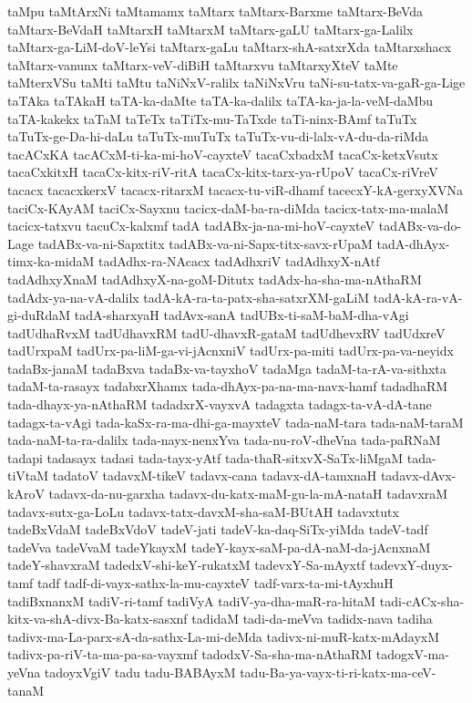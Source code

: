 {taMpu
taMtArxNi
taMtamamx
taMtarx
taMtarx-Barxme
taMtarx-BeVda
taMtarx-BeVdaH
taMtarxH
taMtarxM
taMtarx-gaLU
taMtarx-ga-Lalilx
taMtarx-ga-LiM-doV-leYsi
taMtarx-gaLu
taMtarx-shA-satxrXda
taMtarxshacx
taMtarx-vanunx
taMtarx-veV-diBiH
taMtarxvu
taMtarxyXteV
taMte
taMterxVSu
taMti
taMtu
taNiNxV-ralilx
taNiNxVru
taNi-su-tatx-va-gaR-ga-Lige
taTAka
taTAkaH
taTA-ka-daMte
taTA-ka-dalilx
taTA-ka-ja-la-veM-daMbu
taTA-kakekx
taTaM
taTeTx
taTiTx-mu-TaTxde
taTi-ninx-BAmf
taTuTx
taTuTx-ge-Da-hi-daLu
taTuTx-muTuTx
taTuTx-vu-di-lalx-vA-du-da-riMda
tacACxKA
tacACxM-ti-ka-mi-hoV-cayxteV
tacaCxbadxM
tacaCx-ketxVsutx
tacaCxkitxH
tacaCx-kitx-riV-ritA
tacaCx-kitx-tarx-ya-rUpoV
tacaCx-riVreV
tacacx
tacacxkerxV
tacacx-ritarxM
tacacx-tu-viR-dhamf
tacecxY-kA-gerxyXVNa
taciCx-KAyAM
taciCx-Sayxnu
tacicx-daM-ba-ra-diMda
tacicx-tatx-ma-malaM
tacicx-tatxvu
tacuCx-kalxmf
tadA
tadABx-ja-na-mi-hoV-cayxteV
tadABx-va-do-Lage
tadABx-va-ni-Sapxtitx
tadABx-va-ni-Sapx-titx-savx-rUpaM
tadA-dhAyx-timx-ka-midaM
tadAdhx-ra-NAcacx
tadAdhxriV
tadAdhxyX-nAtf
tadAdhxyXnaM
tadAdhxyX-na-goM-Ditutx
tadAdx-ha-sha-ma-nAthaRM
tadAdx-ya-na-vA-dalilx
tadA-kA-ra-ta-patx-sha-satxrXM-gaLiM
tadA-kA-ra-vA-gi-duRdaM
tadA-sharxyaH
tadAvx-sanA
tadUBx-ti-saM-baM-dha-vAgi
tadUdhaRvxM
tadUdhavxRM
tadU-dhavxR-gataM
tadUdhevxRV
tadUdxreV
tadUrxpaM
tadUrx-pa-liM-ga-vi-jAcnxniV
tadUrx-pa-miti
tadUrx-pa-va-neyidx
tadaBx-janaM
tadaBxva
tadaBx-va-tayxhoV
tadaMga
tadaM-ta-rA-va-sithxta
tadaM-ta-rasayx
tadabxrXhamx
tada-dhAyx-pa-na-ma-navx-hamf
tadadhaRM
tada-dhayx-ya-nAthaRM
tadadxrX-vayxvA
tadagxta
tadagx-ta-vA-dA-tane
tadagx-ta-vAgi
tada-kaSx-ra-ma-dhi-ga-mayxteV
tada-naM-tara
tada-naM-taraM
tada-naM-ta-ra-dalilx
tada-nayx-nenxYva
tada-nu-roV-dheVna
tada-paRNaM
tadapi
tadasayx
tadasi
tada-tayx-yAtf
tada-thaR-sitxvX-SaTx-liMgaM
tada-tiVtaM
tadatoV
tadavxM-tikeV
tadavx-cana
tadavx-dA-tamxnaH
tadavx-dAvx-kAroV
tadavx-da-nu-garxha
tadavx-du-katx-maM-gu-la-mA-nataH
tadavxraM
tadavx-sutx-ga-LoLu
tadavx-tatx-davxM-sha-saM-BUtAH
tadavxtutx
tadeBxVdaM
tadeBxVdoV
tadeV-jati
tadeV-ka-daq-SiTx-yiMda
tadeV-tadf
tadeVva
tadeVvaM
tadeYkayxM
tadeY-kayx-saM-pa-dA-naM-da-jAcnxnaM
tadeY-shavxraM
tadedxV-shi-keY-rukatxM
tadevxY-Sa-mAyxtf
tadevxY-duyx-tamf
tadf
tadf-di-vayx-sathx-la-mu-cayxteV
tadf-varx-ta-mi-tAyxhuH
tadiBxnanxM
tadiV-ri-tamf
tadiVyA
tadiV-ya-dha-maR-ra-hitaM
tadi-cACx-sha-kitx-va-shA-divx-Ba-katx-sasxnf
tadidaM
tadi-da-meVva
tadidx-nava
tadiha
tadivx-ma-La-parx-sA-da-sathx-La-mi-deMda
tadivx-ni-muR-katx-mAdayxM
tadivx-pa-riV-ta-ma-pa-sa-vayxmf
tadodxV-Sa-sha-ma-nAthaRM
tadogxV-ma-yeVna
tadoyxVgiV
tadu
tadu-BABAyxM
tadu-Ba-ya-vayx-ti-ri-katx-ma-ceV-tanaM
}
